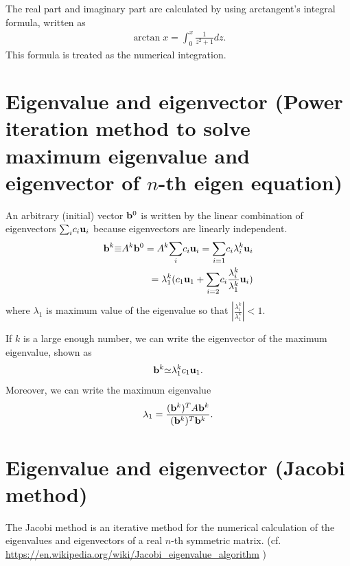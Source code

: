 \documentclass[dvipdfmx]{article}
\begin{document}
The real part and imaginary part are calculated by using arctangent's integral formula, written as
 \begin{eqnarray}
 \arctan{x} = {\int_0^x} \frac{1}{z^2 + 1} dz. \nonumber
 \end{eqnarray}
 This formula is treated as the numerical integration.


\section*{Eigenvalue and eigenvector (Power iteration method to solve maximum eigenvalue and eigenvector of $n$-th eigen equation)}
An arbitrary (initial) vector ${\bf{b}}^0$ is written by the linear combination of eigenvectors ${\sum_i} c_i{\bf{u}}_i$
because eigenvectors are linearly independent.
\begin{eqnarray}
{\bf{b}}^k {\equiv} A^k {\bf{b}}^0 = A^k {\sum_i} c_i{\bf{u}}_i = {\sum_{i=1}} c_i {\lambda}^k_i {\bf{u}}_i \nonumber \\
= {\lambda}_1^k (c_1{\bf{u}}_1 + {\sum_{i=2}} c_i \frac{{\lambda}^k_i}{{\lambda}^k_1} {\bf{u}}_i)  \nonumber
\end{eqnarray}
where ${\lambda}_1$ is maximum value of the eigenvalue so that $|\frac{{\lambda}^k_i}{{\lambda}^k_1}| < 1$.

If $k$ is a large enough number, 
we can write the eigenvector of the maximum eigenvalue, shown as
\begin{eqnarray}
{\bf{b}}^k {\simeq} {\lambda}^k_1c_1{\bf{u}}_1. \nonumber
\end{eqnarray} 
Moreover,  we can write the maximum eigenvalue
\begin{eqnarray}
{\lambda}_1 = \frac{({\bf{b}}^k)^TA{\bf{b}}^k}{({\bf{b}}^k)^T{\bf{b}}^k}. \nonumber
\end{eqnarray}


\section*{Eigenvalue and eigenvector (Jacobi method)}
The Jacobi method is an iterative method for the numerical calculation of the eigenvalues and eigenvectors of a real $n$-th symmetric matrix.
(cf. \url{https://en.wikipedia.org/wiki/Jacobi_eigenvalue_algorithm} )
\end{document}
